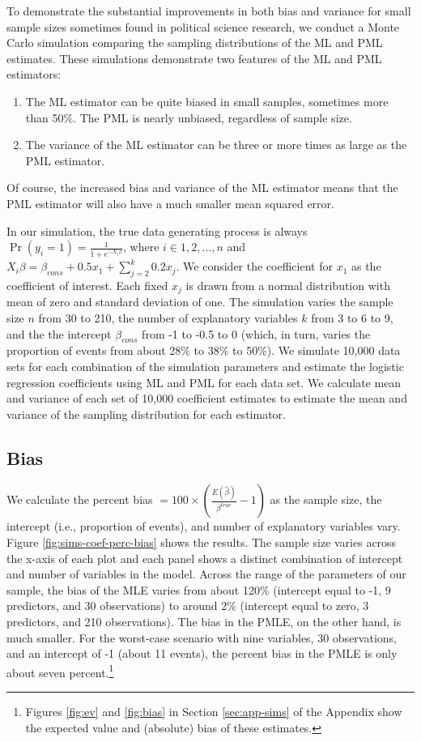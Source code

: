 \documentclass[12pt]{article}
\begin{document}
To demonstrate the substantial improvements in both bias and variance for small sample sizes sometimes found in political science research, we conduct a Monte Carlo simulation comparing the sampling distributions of the ML and PML estimates.
These simulations demonstrate two features of the ML and PML estimators:
\begin{enumerate}
\item The ML estimator can be quite biased in small samples, sometimes more than 50\%. The PML is nearly unbiased, regardless of sample size.
\item The variance of the ML estimator can be three or more times as large as the PML estimator.
\end{enumerate}
Of course, the increased bias and variance of the ML estimator means that the PML estimator will also have a much smaller mean squared error.

In our simulation, the true data generating process is always $\Pr(y_i = 1) = \frac{1}{1 + e^{-X_i \beta}}$, where $i \in 1, 2,..., n$ and $X_i \beta = \beta_{cons} + 0.5 x_1 + \sum_{j = 2}^k 0.2 x_j$. 
We consider the coefficient for $x_1$ as the coefficient of interest.
Each fixed $x_j$ is drawn from a normal distribution with mean of zero and standard deviation of one. 
The simulation varies the sample size $n$ from 30 to 210, the number of explanatory variables $k$ from 3 to 6 to 9, and the the intercept $\beta_{cons}$ from -1 to -0.5 to 0 (which, in turn, varies the proportion of events from about 28\% to 38\% to 50\%). 
We simulate 10,000 data sets for each combination of the simulation parameters and estimate the logistic regression coefficients using ML and PML for each data set.
We calculate mean and variance of each set of 10,000 coefficient estimates to estimate the mean and variance of the sampling distribution for each estimator. 

\subsection*{Bias}

We calculate the percent bias $= 100 \times \left(\frac{E(\hat{\beta})}{\beta^{true}} - 1 \right)$ as the sample size, the intercept (i.e., proportion of events), and number of explanatory variables vary.  
Figure \ref{fig:sims-coef-perc-bias} shows the results. 
The sample size varies across the x-axis of each plot and each panel shows a distinct combination of intercept and number of variables in the model. 
Across the range of the parameters of our sample, the bias of the MLE varies from about 120\% (intercept equal to -1, 9 predictors, and 30 observations) to around 2\% (intercept equal to zero, 3 predictors, and 210 observations). 
The bias in the PMLE, on the other hand, is much smaller. 
For the worst-case scenario with nine variables, 30 observations, and an intercept of -1 (about 11 events), the percent bias in the PMLE is only about seven percent.\footnote{Figures \ref{fig:ev} and \ref{fig:bias} in Section \ref{sec:app-sims} of the Appendix show the expected value and (absolute) bias of these estimates.}
\end{document}
